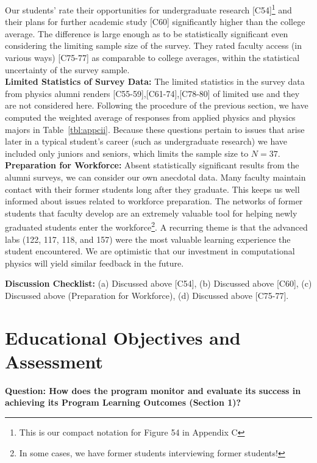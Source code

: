 \documentclass[12pt]{article}
\begin{document}
\noindent
Our students' rate their opportunities for undergraduate research
[C54]\footnote{This is our compact notation for Figure 54 in Appendix C}
 and their plans for further academic study [C60] significantly 
higher than the college average.  The difference is
large enough as to be statistically significant even considering the
limiting sample size of the survey.  They rated faculty access (in
various ways) [C75-77] as comparable to college averages, within the
statistical uncertainty of the survey sample.\\[3pt]

\noindent
{\bf Limited Statistics of Survey Data:} The limited statistics in the
survey data from physics alumni renders [C55-59],[C61-74],[C78-80] of
limited use and they are not considered here.  Following the procedure
of the previous section, we have computed the weighted average of
responses from applied physics and physics majors in
Table~\ref{tbl:appcii}.  Because these questions pertain to issues
that arise later in a typical student's career (such as undergraduate
research) we have included only juniors and seniors, which limits the
sample size to $N=37$.\\[3pt]

\noindent
{\bf Preparation for Workforce:} Absent statistically significant
results from the alumni surveys, we can consider our own anecdotal
data.  Many faculty maintain contact with their former students long
after they graduate.  This keeps us well informed about issues related
to workforce preparation.  The networks of former students that
faculty develop are an extremely valuable tool for helping newly
graduated students enter the workforce\footnote{In some cases, we have
  former students interviewing former students!}.  A recurring theme
is that the advanced labs (122, 117, 118, and 157) were the most
valuable learning experience the student encountered.  We are
optimistic that our investment in computational physics will yield
similar feedback in the future.

\noindent
{\bf Discussion Checklist:} (a) Discussed above [C54], (b) Discussed
above [C60], (c) Discussed above (Preparation for Workforce), (d)
Discussed above [C75-77].

\newpage
\section{Educational Objectives and Assessment}

{\bf Question: How does the program monitor and evaluate its success
  in achieving its Program Learning Outcomes (Section 1)?}\\[3pt]
\end{document}
